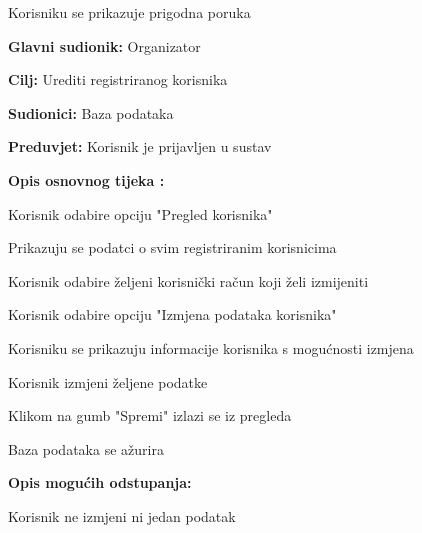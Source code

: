 \begin{packed_item}
\begin{packed_item}
\begin{packed_item}
\begin{packed_enum}
								\item Korisniku se prikazuje prigodna poruka
								
							\end{packed_enum}
				
						\end{packed_item}
					\end{packed_item}
				
					\noindent {}
					\begin{packed_item}
						
						\item \textbf{Glavni sudionik: } Organizator
						\item  \textbf{Cilj:} Urediti registriranog korisnika
						\item  \textbf{Sudionici:} Baza podataka
						\item  \textbf{Preduvjet:} Korisnik je prijavljen u sustav
						\item  \textbf{Opis osnovnog tijeka :}
						
						\item[] \begin{packed_enum}
							
							\item Korisnik odabire opciju "Pregled korisnika"
							\item Prikazuju se podatci o svim registriranim korisnicima
							\item Korisnik odabire željeni korisnički račun koji želi izmijeniti
							\item Korisnik odabire opciju "Izmjena podataka korisnika"
							\item Korisniku se prikazuju informacije korisnika s mogućnosti izmjena
							\item Korisnik izmjeni željene podatke
							\item Klikom na gumb "Spremi" izlazi se iz pregleda
							\item Baza podataka se ažurira
						\end{packed_enum}
						
						\item  \textbf{Opis mogućih odstupanja:}
						
						\item[] \begin{packed_item}
							
							\item[2.a] Korisnik ne izmjeni ni jedan podatak
							\item[] \begin{packed_enum}
								

\end{packed_enum}
\end{packed_item}
\end{packed_item}
\end{packed_item}
